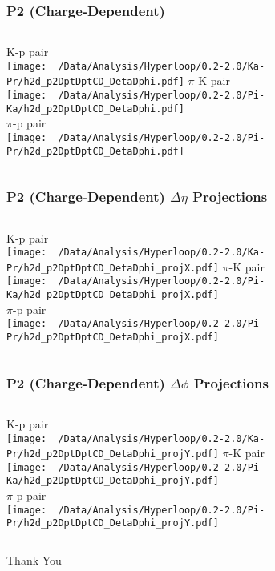\documentclass{beamer}
\begin{document}
\begin{frame}
	\frametitle{P2 (Charge-Dependent)}
	\begin{columns}
		\centering
		K-p pair\\
		\texttt{[image: ~/Data/Analysis/Hyperloop/0.2-2.0/Ka-Pr/h2d\_p2DptDptCD\_DetaDphi.pdf]}
		\centering
		$\pi$-K pair\\
		\texttt{[image: ~/Data/Analysis/Hyperloop/0.2-2.0/Pi-Ka/h2d\_p2DptDptCD\_DetaDphi.pdf]}\\$\pi$-p pair\\
		\texttt{[image: ~/Data/Analysis/Hyperloop/0.2-2.0/Pi-Pr/h2d\_p2DptDptCD\_DetaDphi.pdf]}
	\end{columns}
\end{frame}
\begin{frame}
	\frametitle{P2 (Charge-Dependent) $\Delta\eta$ Projections}
	\begin{columns}
		\column{0.5\textwidth}
		\centering
		K-p pair\\
		\texttt{[image: ~/Data/Analysis/Hyperloop/0.2-2.0/Ka-Pr/h2d\_p2DptDptCD\_DetaDphi\_projX.pdf]}
		\column{0.5\textwidth}
		\centering
		$\pi$-K pair\\
		\texttt{[image: ~/Data/Analysis/Hyperloop/0.2-2.0/Pi-Ka/h2d\_p2DptDptCD\_DetaDphi\_projX.pdf]}\\$\pi$-p pair\\
		\texttt{[image: ~/Data/Analysis/Hyperloop/0.2-2.0/Pi-Pr/h2d\_p2DptDptCD\_DetaDphi\_projX.pdf]}
	\end{columns}
\end{frame}
\begin{frame}
	\frametitle{P2 (Charge-Dependent) $\Delta\phi$ Projections}
	\begin{columns}
		\centering
		K-p pair\\
		\texttt{[image: ~/Data/Analysis/Hyperloop/0.2-2.0/Ka-Pr/h2d\_p2DptDptCD\_DetaDphi\_projY.pdf]}
		\centering
		$\pi$-K pair\\
		\texttt{[image: ~/Data/Analysis/Hyperloop/0.2-2.0/Pi-Ka/h2d\_p2DptDptCD\_DetaDphi\_projY.pdf]}\\$\pi$-p pair\\
		\texttt{[image: ~/Data/Analysis/Hyperloop/0.2-2.0/Pi-Pr/h2d\_p2DptDptCD\_DetaDphi\_projY.pdf]}
	\end{columns}
\end{frame}
\begin{frame}
	\centering\Huge Thank You
\end{frame}
\end{document}
